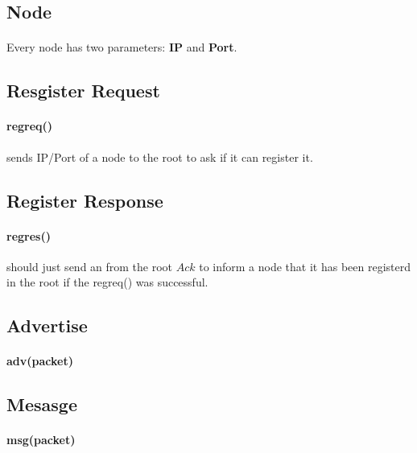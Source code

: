 \documentclass{article}
\begin{document}
\subsection{Node}
\paragraph{}Every node has two parameters: \textbf{IP} and \textbf{Port}.
\subsection{Resgister Request}
\paragraph{reg\underline{\hspace{.05in}}req()} sends IP/Port of a node to the root to ask if it can register it. 
\subsection{Register Response}
\paragraph{reg\underline{\hspace{.05in}}res()} should just send an from the root $Ack$ to inform a node that it has been registerd in the root if the reg\underline{\hspace{.05in}}req() was successful.
\subsection{Advertise}
\paragraph{adv(packet)}
\subsection{Mesasge}
\paragraph{msg(packet)}
\clearpage
\end{document}
